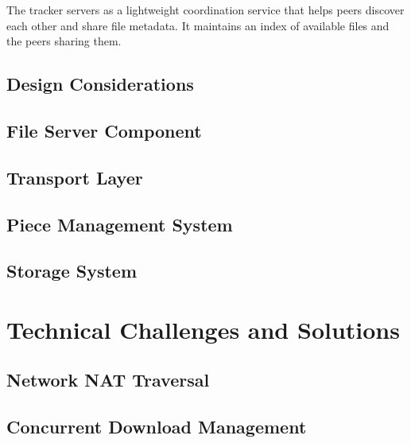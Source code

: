 \documentclass[12pt,a4paper]{report}
\begin{document}
The tracker servers as a lightweight coordination service that helps peers discover each other and share file metadata. It maintains an index of available files and the peers sharing them.

\section*{Design Considerations}

\section{File Server Component}

\section{Transport Layer}

\section{Piece Management System}

\section{Storage System}

\chapter{Technical Challenges and Solutions}
\section{Network NAT Traversal}

\section{Concurrent Download Management}
\end{document}
